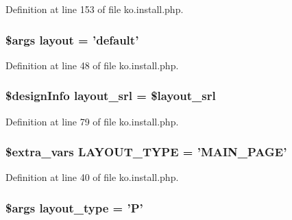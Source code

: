 Definition at line 153 of file ko.\+install.\+php.

\hypertarget{ko_8install_8php_a0dc2cdff7167f362443808ff71ae5177}{
\subsubsection[{layout}]{\setlength{\rightskip}{0pt plus 5cm}\$args {\bf layout} = 'default'}}\label{ko_8install_8php_a0dc2cdff7167f362443808ff71ae5177}


Definition at line 48 of file ko.\+install.\+php.

\hypertarget{ko_8install_8php_a70054876db09b2519a1726663c8dd9e7}{
\subsubsection[{layout\+\_\+srl}]{\setlength{\rightskip}{0pt plus 5cm}\$design\+Info layout\+\_\+srl = \$layout\+\_\+srl}}\label{ko_8install_8php_a70054876db09b2519a1726663c8dd9e7}


Definition at line 79 of file ko.\+install.\+php.

\hypertarget{ko_8install_8php_a559e719d2ff17f12b8fba72773e6601d}{
\subsubsection[{L\+A\+Y\+O\+U\+T\+\_\+\+T\+Y\+P\+E}]{\setlength{\rightskip}{0pt plus 5cm}\${\bf extra\+\_\+vars} L\+A\+Y\+O\+U\+T\+\_\+\+T\+Y\+P\+E = 'M\+A\+I\+N\+\_\+\+P\+A\+G\+E'}}\label{ko_8install_8php_a559e719d2ff17f12b8fba72773e6601d}


Definition at line 40 of file ko.\+install.\+php.

\hypertarget{ko_8install_8php_a0532d89570cfdaebc628afac2ff5a81b}{
\subsubsection[{layout\+\_\+type}]{\setlength{\rightskip}{0pt plus 5cm}\$args layout\+\_\+type = 'P'}}\label{ko_8install_8php_a0532d89570cfdaebc628afac2ff5a81b}


